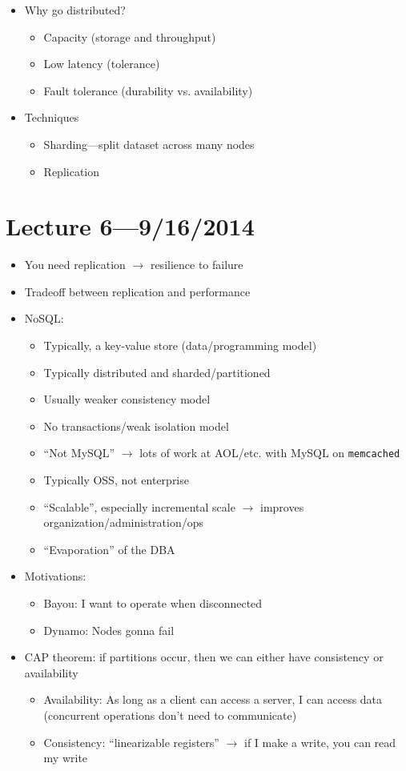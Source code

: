\documentclass[10pt]{article}
\begin{document}
\begin{itemize}
\item Why go distributed?
\begin{itemize}
\item Capacity (storage and throughput)
\item Low latency (tolerance)
\item Fault tolerance (durability vs. availability)
\end{itemize}
\item Techniques
\begin{itemize}
\item Sharding---split dataset across many nodes
\item Replication
\end{itemize}
\end{itemize}

\section{Lecture 6---9/16/2014}

\begin{itemize}
\item You need replication $\rightarrow$ resilience to failure
\item Tradeoff between replication and performance
\item NoSQL:
\begin{itemize}
\item Typically, a key-value store (data/programming model)
\item Typically distributed and sharded/partitioned
\item Usually weaker consistency model
\item No transactions/weak isolation model
\item ``Not MySQL'' $\rightarrow$ lots of work at AOL/etc. with MySQL on \texttt{memcached}
\item Typically OSS, not enterprise
\item ``Scalable'', especially incremental scale $\rightarrow$ improves organization/administration/ops
\item ``Evaporation'' of the DBA
\end{itemize}
\item Motivations:
\begin{itemize}
\item Bayou: I want to operate when disconnected
\item Dynamo: Nodes gonna fail
\end{itemize}
\item CAP theorem: if partitions occur, then we can either have consistency or availability
\begin{itemize}
\item Availability: As long as a client can access a server, I can access data (concurrent operations
don't need to communicate)
\item Consistency: ``linearizable registers'' $\rightarrow$ if I make a write, you can read my write
\end{itemize}
\end{itemize}
\end{document}
